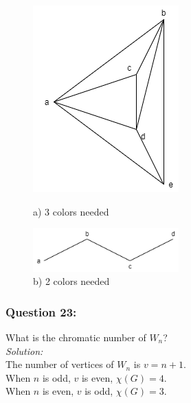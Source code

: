 \documentclass[a4paper]{article}
\begin{document}
	\begin{figure}[H]
		\begin{minipage}{0.5\textwidth}
			\centering
			\includegraphics[width=0.5\textwidth]{tut922_3.png}
			\caption*{a) 3 colors needed}
		\end{minipage}
		\begin{minipage}{0.5\textwidth}
			\centering
			\includegraphics[width=0.5\textwidth]{tut922_4.png}
			\caption*{b) 2 colors needed}
		\end{minipage}
	\end{figure}
	
	\subsubsection*{Question 23:}
	What is the chromatic number of $W_n$? \\
	\emph{Solution:}\\
	The number of vertices of $W_n$ is  $v = n+1$. \\
	When $n$ is odd, $v$ is even, $\chi(G) =4$. \\
	When $n$ is even, $v$ is odd, $\chi(G) =3$. \\
\end{document}

